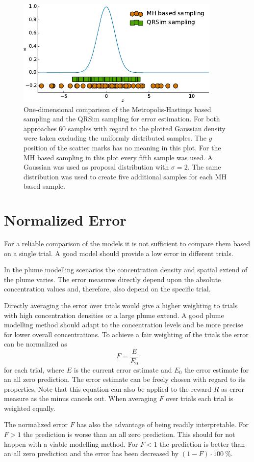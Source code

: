 \begin{figure}
    \centering
    \includegraphics{plots/err-sampling}
    \caption[Comparison of error estimation sampling methods]{One-dimensional 
        comparison of the Metropolis-Hastings based sampling and the QRSim 
        sampling for error estimation. For both approaches 60 samples with 
        regard to the plotted Gaussian density were taken excluding the 
        uniformly distributed samples.  The $y$ position of the scatter marks 
        has no meaning in this plot. For the MH based sampling in this plot 
        every fifth sample was used.  A Gaussian was used as proposal 
        distribution with $\sigma = 2$.  The same distribution was used to 
        create five additional samples for each MH based 
        sample.}\label{fig:err-sampling}
\end{figure}

\section{Normalized Error}
For a reliable comparison of the models it is not sufficient to compare them 
based on a single trial. A good model should provide a low error in different 
trials.

In the plume modelling scenarios the concentration density and spatial extend of 
the plume varies. The error measures directly depend upon the absolute 
concentration values and, therefore, also depend on the specific trial.

Directly averaging the error over trials would give a higher weighting to trials 
with high concentration densities or a large plume extend. A good plume 
modelling method should adapt to the concentration levels and be more precise 
for lower overall concentrations. To achieve a fair weighting of the trials the 
error can be normalized as
\begin{equation}
    F = \frac{E}{E_0}
\end{equation}
for each trial, where $E$ is the current error estimate and $E_0$ the error 
estimate for an all zero prediction. The error estimate can be freely chosen 
with regard to its properties. Note that this equation can also be applied to 
the reward $R$ as error measure as the minus cancels out. When averaging $F$ 
over trials each trial is weighted equally.

The normalized error $F$ has also the advantage of being readily interpretable.  
For $F > 1$ the prediction is worse than an all zero prediction.  This should 
for not happen with a viable modelling method. For $F < 1$ the prediction is 
better than an all zero prediction and the error has been decreased by $(1 - F) 
\cdot \SI{100}{\percent}$.
